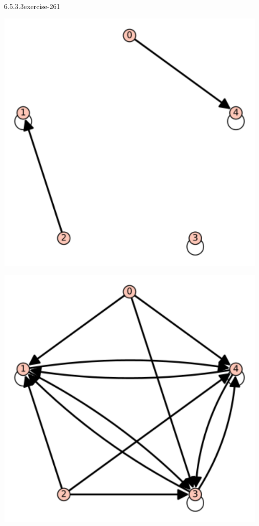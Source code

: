 \documentclass[twoside,10pt,]{book}
\numberwithin{equation}{section}
\begin{document}
\begin{divisionsolution}{6.5.3.3}{}{exercise-261}
\begin{sidebyside}{2}{0.01}{0.01}{0.02}
\begin{sbspanel}{0.48}
\includegraphics[width=1\linewidth]{images/S65-3s3}
\end{sbspanel}%
\begin{sbspanel}{0.48}%
\includegraphics[width=1\linewidth]{images/S65-3stc}
\end{sbspanel}%
\nopagebreak%
\begin{sbscaption}{0.48}%
\end{sbscaption}%
\begin{sbscaption}{0.48}%
\end{sbscaption}%
\end{sidebyside}%
\end{divisionsolution}%
\end{document}
